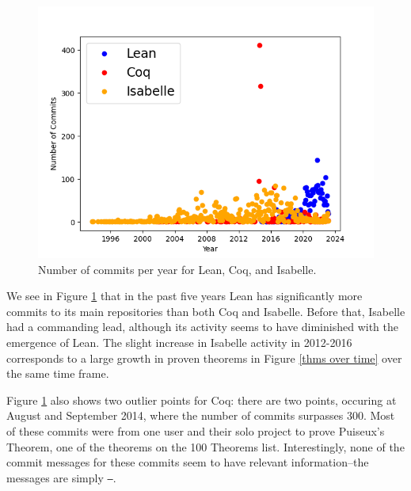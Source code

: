 \documentclass[sigconf,nonacm]{acmart}
\begin{document}
\begin{figure}[H]
  \includegraphics[scale=0.5]{compare_commits.png}
  \caption{Number of commits per year for Lean, Coq, and Isabelle.}
  \label{commits per year}
\end{figure}

We see in Figure \ref{commits per year} that in the past five years Lean has significantly more commits to its main repositories than both Coq and Isabelle. Before that, Isabelle had a commanding lead, although its activity seems to have diminished with the emergence of Lean. The slight increase in Isabelle activity in 2012-2016 corresponds to a large growth in proven theorems in Figure \ref{thms over time} over the same time frame.

Figure \ref{commits per year} also shows two outlier points for Coq: there are two points, occuring at August and September 2014, where the number of commits surpasses 300. Most of these commits were from one user and their solo project to prove Puiseux's Theorem, one of the theorems on the 100 Theorems list. Interestingly, none of the commit messages for these commits seem to have relevant information--the messages are simply \texttt{--}.
\end{document}
